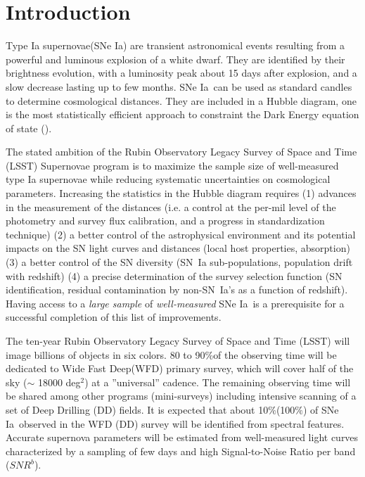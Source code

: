 \documentclass[skiphelvet,twocolumn]{lsstdescnote}
\newcommand{\snrb}{\mbox{$SNR^b$}}
\newcommand{\sne}{{SNe Ia}}
\newcommand{\degsq}{{deg$^2$}}
\newcommand{\per}{$\%$}
\begin{document}
\section{Introduction}
\label{sec:intro}
Type Ia supernovae(\sne) are transient astronomical events resulting from a powerful and luminous explosion of a white dwarf. They are identified by their brightness evolution, with a luminosity peak about 15 days after explosion, and a slow decrease lasting up to few months. \sne~can be used as standard candles to determine cosmological distances. They are included in a Hubble diagram, one is the most statistically efficient approach to constraint the Dark Energy equation of state (\citealt{Betoule_2014,Scolnic_2018}).
\par
The stated ambition of the Rubin Observatory Legacy Survey of Space and Time (LSST) Supernovae program is to maximize the sample size of well-measured type Ia supernovae while reducing systematic uncertainties on cosmological parameters. Increasing the statistics in the Hubble diagram requires (1) advances in the measurement of the distances (i.e.  a control at the per-mil level of the photometry and survey flux calibration, and a progress in standardization technique) (2) a better control of the astrophysical environment and its potential impacts on the SN light curves and distances (local host properties, absorption) (3) a better control of the SN diversity (SN~Ia sub-populations, population drift with redshift) (4) a precise determination of the survey selection function (SN identification, residual contamination by non-SN~Ia's as a function of redshift). Having access to a {\it large sample} of {\it well-measured} \sne~is a prerequisite for a successful completion of this list of improvements.
\par
The ten-year Rubin Observatory Legacy Survey of Space and Time (LSST) will image billions of objects in six colors. 80 to 90\per of the observing time will be dedicated to Wide Fast Deep(WFD) primary survey, which will cover half of the sky ($\sim$ 18000 \degsq) at a ''universal'' cadence. The remaining observing time will be shared among other programs (mini-surveys) including intensive scanning of a set of Deep Drilling (DD) fields. It is expected that about 10\per (100\per) of \sne~observed in the WFD (DD) survey will be identified from spectral features. Accurate supernova parameters will be estimated from well-measured light curves characterized by a sampling of few days and high Signal-to-Noise Ratio per band (\snrb).  %
\end{document}
